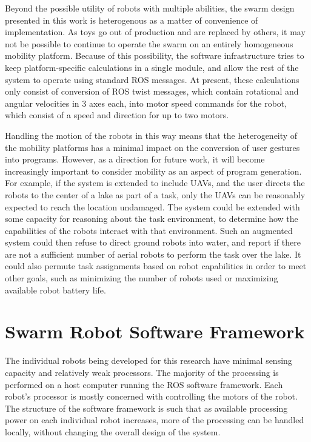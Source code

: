 Beyond the possible utility of robots with multiple abilities, the swarm design presented in this work is heterogenous as a matter of convenience of implementation. 
As toys go out of production and are replaced by others, it may not be possible to continue to operate the swarm on an entirely homogeneous mobility platform. 
Because of this possibility, the software infrastructure tries to keep platform-specific calculations in a single module, and allow the rest of the system to operate using standard ROS messages. 
At present, these calculations only consist of conversion of ROS twist messages, which contain rotational and angular velocities in 3 axes each, into motor speed commands for the robot, which consist of a speed and direction for up to two motors. 

Handling the motion of the robots in this way means that the heterogeneity of the mobility platforms has a minimal impact on the conversion of user gestures into programs. 
However, as a direction for future work, it will become increasingly important to consider mobility as an aspect of program generation. 
For example, if the system is extended to include UAVs, and the user directs the robots to the center of a lake as part of a task, only the UAVs can be reasonably expected to reach the location undamaged. 
The system could be extended with some capacity for reasoning about the task environment, to determine how the capabilities of the robots interact with that environment. 
Such an augmented system could then refuse to direct ground robots into water, and report if there are not a sufficient number of aerial robots to perform the task over the lake. 
It could also permute task assignments based on robot capabilities in order to meet other goals, such as minimizing the number of robots used or maximizing available robot battery life. 

\section{Swarm Robot Software Framework} \label{section:Swarm_Robot_Software_Framework}

The individual robots being developed for this research have minimal sensing capacity and relatively weak processors. 
The majority of the processing is performed on a host computer running the ROS software framework. 
Each robot's processor is mostly concerned with controlling the motors of the robot. 
The structure of the software framework is such that as available processing power on each individual robot increases, more of the processing can be handled locally, without changing the overall design of the system.

